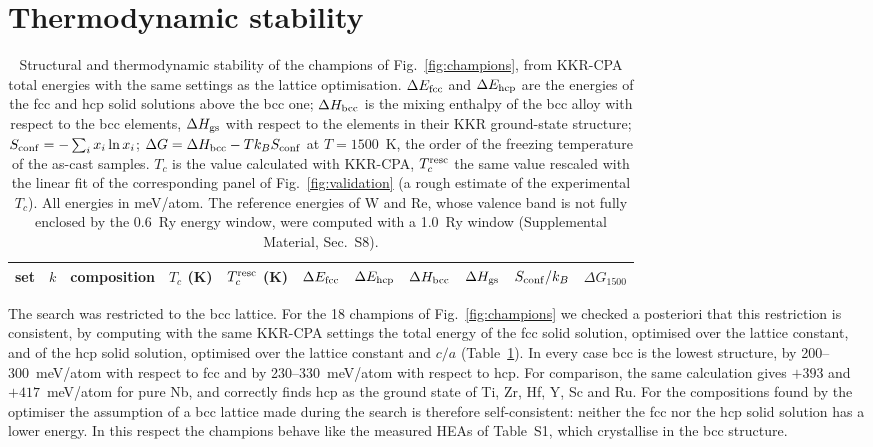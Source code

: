 \documentclass[aps,prb,reprint,superscriptaddress,twocolumn,floatfix]{revtex4-2}
\newcommand{\Tc}{$T_c$}
\newcommand{\SI}[1]{Supplemental Material, Sec.~#1}
\begin{document}
\section{Thermodynamic stability}
\label{sec:td}

\begin{table}
\caption{Structural and thermodynamic stability of the champions of Fig.~\ref{fig:champions},
from KKR-CPA total energies with the same settings as the lattice optimisation. $\Delta E_{\rm
fcc}$ and $\Delta E_{\rm hcp}$ are the energies of the fcc and hcp solid solutions above the bcc
one; $\Delta H_{\rm bcc}$ is the mixing enthalpy of the bcc alloy with respect to the bcc
elements, $\Delta H_{\rm gs}$ with respect to the elements in their KKR ground-state
structure; $S_{\rm conf} = -\sum_i x_i \ln x_i$; $\Delta G = \Delta H_{\rm bcc} - T k_B S_{\rm
conf}$ at $T = 1500$~K, the order of the freezing temperature of the as-cast samples. $T_c$ is the value calculated with KKR-CPA, $T_c^{\rm resc}$ the same value rescaled with the linear fit of
the corresponding panel of Fig.~\ref{fig:validation} (a rough estimate of the experimental \Tc). All
energies in meV/atom. The reference energies of W and Re, whose valence band is not fully
enclosed by the 0.6~Ry energy window, were computed with a 1.0~Ry window (\SI{S8}).}
\label{tab:td}
\begin{ruledtabular}
\begin{tabular}{clcrrrrrrrr}
set & $k$ & composition & $T_c$ (K) & $T_c^{\rm resc}$ (K) & $\Delta E_{\rm fcc}$ & $\Delta E_{\rm hcp}$ &
$\Delta H_{\rm bcc}$ & $\Delta H_{\rm gs}$ & $S_{\rm conf}/k_B$ & $\Delta G_{1500}$ \\
\hline

\end{tabular}
\end{ruledtabular}
\end{table}

The search was restricted to the bcc lattice. For the 18 champions of
Fig.~\ref{fig:champions} we checked a posteriori that this restriction is consistent, by
computing with the same KKR-CPA settings the total energy of the fcc solid solution, optimised
over the lattice constant, and of the hcp solid solution, optimised over the lattice constant
and $c/a$ (Table~\ref{tab:td}). In every case bcc is the lowest structure, by 200--300~meV/atom with
respect to fcc and by 230--330~meV/atom with respect to hcp. For comparison, the same
calculation gives $+393$ and $+417$~meV/atom for pure Nb, and correctly finds hcp as the
ground state of Ti, Zr, Hf, Y, Sc and Ru. For the compositions found by the optimiser
the assumption of a bcc lattice made during the search is therefore self-consistent: neither
the fcc nor the hcp solid solution has a lower energy. In this respect the champions behave
like the measured HEAs of Table~S1, which crystallise in the bcc structure.
\end{document}
